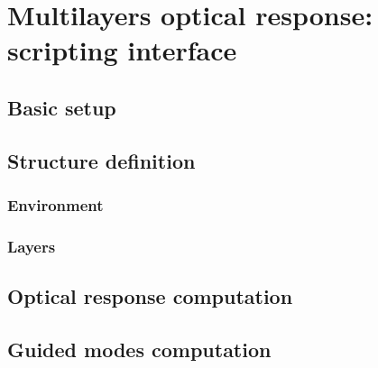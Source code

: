 \chapter{Multilayers optical response: scripting interface}

\section{Basic setup}



\section{Structure definition}



\subsection{Environment}



\subsection{Layers}


\section{Optical response computation}


\section{Guided modes computation}

